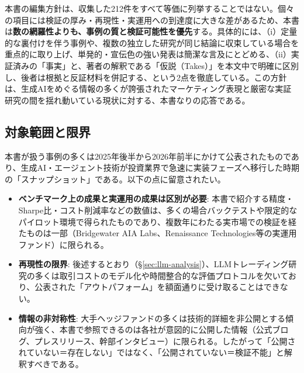 本書の編集方針は、収集した212件をすべて等価に列挙することではない。個々の項目には検証の厚み・再現性・実運用への到達度に大きな差があるため、本書は\textbf{数の網羅性よりも、事例の質と検証可能性を優先}する。具体的には、（i）定量的な裏付けを伴う事例や、複数の独立した研究が同じ結論に収束している場合を重点的に取り上げ、単発的・宣伝色の強い発表は簡潔な言及にとどめる、（ii）実証済みの「事実」と、著者の解釈である「仮説（Takes）」を本文中で明確に区別し、後者は根拠と反証材料を併記する、という2点を徹底している。この方針は、生成AIをめぐる情報の多くが誇張されたマーケティング表現と厳密な実証研究の間を揺れ動いている現状に対する、本書なりの応答である。

\subsection{対象範囲と限界}

本書が扱う事例の多くは2025年後半から2026年前半にかけて公表されたものであり、生成AI・エージェント技術が投資業界で急速に実装フェーズへ移行した時期の「スナップショット」である。以下の点に留意されたい。

\begin{itemize}
  \item \textbf{ベンチマーク上の成果と実運用の成果は区別が必要}: 本書で紹介する精度・Sharpe比・コスト削減率などの数値は、多くの場合バックテストや限定的なパイロット環境で得られたものであり、複数年にわたる実市場での検証を経たものは一部（Bridgewater AIA Labs、Renaissance Technologies等の実運用ファンド）に限られる。
  \item \textbf{再現性の限界}: 後述するとおり（\S\ref{sec:llm-analysis}）、LLMトレーディング研究の多くは取引コストのモデル化や時間整合的な評価プロトコルを欠いており、公表された「アウトパフォーム」を額面通りに受け取ることはできない。
  \item \textbf{情報の非対称性}: 大手ヘッジファンドの多くは技術的詳細を非公開とする傾向が強く、本書で参照できるのは各社が意図的に公開した情報（公式ブログ、プレスリリース、幹部インタビュー）に限られる。したがって「公開されていない＝存在しない」ではなく、「公開されていない＝検証不能」と解釈すべきである。
\end{itemize}

